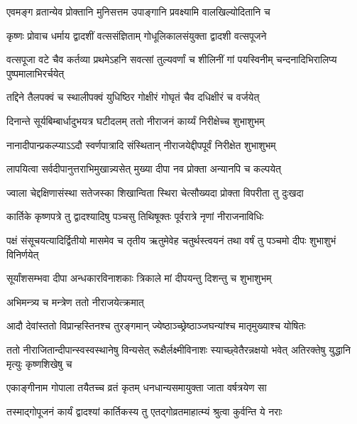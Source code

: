 \twolineshloka
{एवमङ्ग व्रतान्येव प्रोक्तानि मुनिसत्तम}
{उपाङ्गानि प्रवक्ष्यामि वालखिल्योदितानि च} %





\twolineshloka
{कृष्णः प्रोवाच धर्माय द्वादशीं वत्ससंज्ञिताम्}
{गोधूलिकालसंयुक्ता द्वादशी वत्सपूजने} %

\threelineshloka
{वत्सपूजा वटे चैव कर्तव्या प्रथमेऽहनि}
{सवत्सां तुल्यवर्णां च शीलिनीं गां पयस्विनीम्}
{चन्दनादिभिरालिप्य पुष्पमालाभिरर्चयेत्} %

\twolineshloka
{तद्दिने तैलपक्वं च स्थालीपक्वं युधिष्ठिर}
{गोक्षीरं गोघृतं चैव दधिक्षीरं च वर्जयेत्} %

\twolineshloka
{दिनान्ते सूर्यबिम्बार्धादुभयत्र घटीदलम्}
{ततो नीराजनं कार्य्यं निरीक्षेच्च शुभाशुभम्} %

\twolineshloka
{नानादीपान्प्रकल्प्याऽऽदौ स्वर्णपात्रादि संस्थितान्}
{नीराजयेद्दीपपूर्वं निरीक्षेत शुभाशुभम्} %

\twolineshloka
{लापयित्वा सर्वदीपानुत्तराभिमुखान्न्यसेत्}
{मुख्या दीपा नव प्रोक्ता अन्यानपि च कल्पयेत्} %

\twolineshloka
{ज्वाला चेद्दक्षिणासंस्था सतेजस्का शिखान्विता}
{स्थिरा चेत्सौख्यदा प्रोक्ता विपरीता तु दुःखदा} %

\twolineshloka
{कार्तिके कृष्णपत्रे तु द्वादश्यादिषु पञ्चसु}
{तिथिषूक्तः पूर्वरात्रे नृणां नीराजनाविधिः} %

\threelineshloka
{पक्षं संसूचयत्यादिर्द्वितीयो मासमेव च}
{तृतीय ऋतुमेवेह चतुर्थस्त्वयनं तथा}
{वर्षं तु पञ्चमो दीपः शुभाशुभं विनिर्णयेत्} %

\twolineshloka
{सूर्यांशसम्भवा दीपा अन्धकारविनाशकाः}
{त्रिकाले मां दीपयन्तु दिशन्तु च शुभाशुभम्} %


\onelineshloka
{अभिमन्त्र्य च मन्त्रेण ततो नीराजयेत्क्रमात्} %

\twolineshloka
{आदौ देवांस्ततो विप्रान्हस्तिनश्च तुरङ्गमान्}
{ज्येष्ठाञ्च्छ्रेष्ठाञ्जघन्यांश्च मातृमुख्याश्च योषितः} %

\threelineshloka
{ततो नीराजितान्दीपान्स्वस्वस्थानेषु विन्यसेत्}
{रूक्षैर्लक्ष्मीविनाशः स्याच्छ्वेतैरन्नक्षयो भवेत्}
{अतिरक्तेषु युद्धानि मृत्युः कृष्णशिखेषु च} %

\twolineshloka
{एकाङ्गीनाम गोपाला तयैतच्च व्रतं कृतम्}
{धनधान्यसमायुक्ता जाता वर्षत्रयेण सा} %

\twolineshloka
{तस्माद्गोपूजनं कार्यं द्वादश्यां कार्तिकस्य तु}
{एतद्गोव्रतमाहात्म्यं श्रुत्वा कुर्वन्ति ये नराः} %

